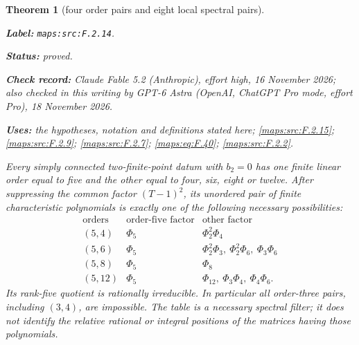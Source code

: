 \documentclass[11pt,a4paper]{article}
\newtheorem{theorem}{Theorem}[section]
\theoremstyle{definition}
\newcommand{\StatementRecord}[4]{\par\smallskip\begingroup\upshape\raggedright\noindent\textbf{Label:} \nolinkurl{#1}.\par\noindent\textbf{Status:} #2.\par\noindent\textbf{Check record:} #3.\par\noindent\textbf{Uses:} #4.\par\endgroup\smallskip}
\newcommand{\CurrentChecker}{GPT-6 Astra (OpenAI, ChatGPT Pro mode, effort Pro), 18 November 2026}
\begin{document}
\begin{theorem}[four order pairs and eight local spectral pairs]\label{maps:src:F.2.14}
\StatementRecord{maps:src:F.2.14}{proved}{Claude Fable 5.2 (Anthropic), effort high, 16 November 2026; also checked in this writing by \CurrentChecker}{the hypotheses, notation and definitions stated here; \cref{maps:src:F.2.15}; \cref{maps:src:F.2.9}; \cref{maps:src:F.2.7}; \cref{maps:eq:F.40}; \cref{maps:src:F.2.2}}


Every simply connected two-finite-point datum with $b_2=0$ has
one finite linear order equal to five and the other equal
to four, six, eight or twelve.
After suppressing the common factor $(T-1)^2$, its unordered
pair of finite characteristic polynomials is exactly one
of the following necessary possibilities:
\[
\begin{array}{c|c|l}
 \text{orders}&\text{order-five factor}&\text{other factor}\\\hline
 (5,4)&\Phi_5&\Phi_2^2\Phi_4\\
 (5,6)&\Phi_5&\Phi_2^2\Phi_3,\ \Phi_2^2\Phi_6,\ \Phi_3\Phi_6\\
 (5,8)&\Phi_5&\Phi_8\\
 (5,12)&\Phi_5&\Phi_{12},\ \Phi_3\Phi_4,\ \Phi_4\Phi_6.
\end{array}
 \tag{F.39}\label{maps:eq:F.39}
\]
Its rank-five quotient is rationally irreducible.
In particular all order-three pairs, including $(3,4)$,
are impossible.  The table is a necessary spectral filter;
it does not identify the relative rational or integral
positions of the matrices having those polynomials.

\end{theorem}
\end{document}
